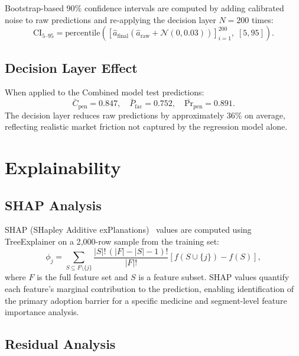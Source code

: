 \documentclass[10pt,journal,compsoc]{IEEEtran}
\begin{document}
Bootstrap-based 90\% confidence intervals are computed by adding calibrated noise to
raw predictions and re-applying the decision layer $N{=}200$ times:
\begin{equation}
  \text{CI}_{5\text{--}95} =
    \mathrm{percentile}\!\left(
      \left[\hat{a}_{\text{final}}\!\left(\hat{a}_{\text{raw}}
        +\mathcal{N}(0,0.03)\right)\right]_{i=1}^{200},\;[5,95]\right).
  \label{eq:bootstrap_ci}
\end{equation}

\subsection{Decision Layer Effect}

When applied to the Combined model test predictions:
\[
  \bar{C}_{\text{pen}}=0.847,\quad
  \bar{P}_{\text{fac}}=0.752,\quad
  \overline{\text{Pr}}_{\text{pen}}=0.891.
\]
The decision layer reduces raw predictions by approximately 36\% on average,
reflecting realistic market friction not captured by the regression model alone.

\section{Explainability}
\label{sec:explain}

\subsection{SHAP Analysis}

SHAP (SHapley Additive exPlanations)~\cite{lundberg2017} values are computed using
TreeExplainer on a 2{,}000-row sample from the training set:
\begin{equation}
  \phi_j = \sum_{S\subseteq F\setminus\{j\}}
    \frac{|S|!\,(|F|-|S|-1)!}{|F|!}
    \left[f(S\cup\{j\})-f(S)\right],
  \label{eq:shap}
\end{equation}
where $F$ is the full feature set and $S$ is a feature subset.
SHAP values quantify each feature's marginal contribution to the prediction, enabling
identification of the primary adoption barrier for a specific medicine and
segment-level feature importance analysis.

\subsection{Residual Analysis}
\end{document}
